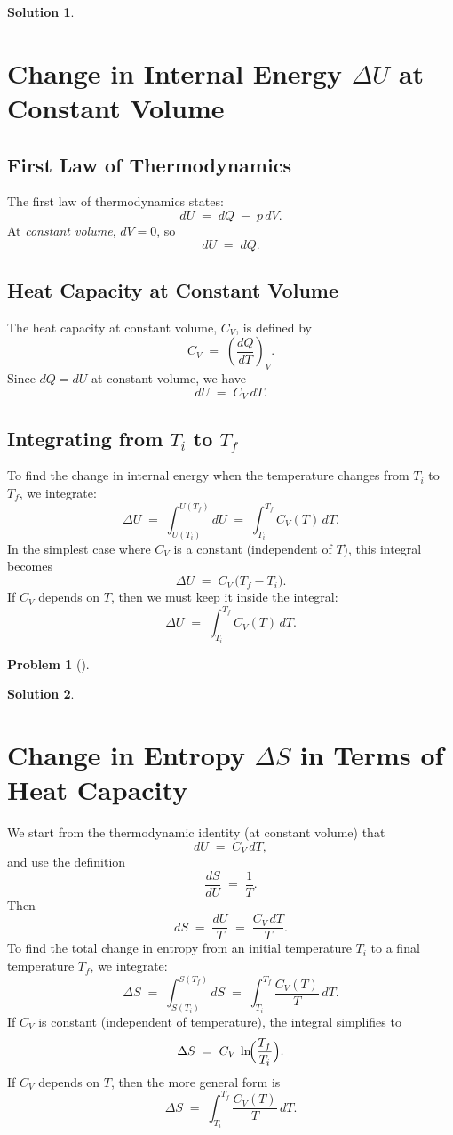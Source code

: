 \documentclass[12pt]{article}
\theoremstyle{definition} %
\newtheorem{solution}{Solution}
\newtheorem{problem}{Problem}
\theoremstyle{plain} %
\begin{document}
\begin{solution}
    \section*{Change in Internal Energy \(\Delta U\) at Constant Volume}

\subsection*{First Law of Thermodynamics}

The first law of thermodynamics states:
\[
dU \;=\; dQ \;-\; p\,dV.
\]
At \emph{constant volume}, \(dV = 0\), so
\[
dU \;=\; dQ.
\]

\subsection*{Heat Capacity at Constant Volume}

The heat capacity at constant volume, \(C_V\), is defined by
\[
C_V \;=\; \left(\frac{dQ}{dT}\right)_{V}.
\]
Since \(dQ = dU\) at constant volume, we have
\[
dU \;=\; C_V \, dT.
\]

\subsection*{Integrating from \(\displaystyle T_i\) to \(\displaystyle T_f\)}

To find the change in internal energy when the temperature changes from \(T_i\) 
to \(T_f\), we integrate:
\[
\Delta U 
\;=\; \int_{U(T_i)}^{U(T_f)} dU
\;=\; \int_{T_i}^{T_f} C_V(T)\,dT.
\]
In the simplest case where \(C_V\) is a constant (independent of \(T\)), 
this integral becomes
\[
\Delta U \;=\; C_V \,\bigl(T_f - T_i\bigr).
\]
If \(C_V\) depends on \(T\), then we must keep it inside the integral:
\[
\Delta U 
\;=\; \int_{T_i}^{T_f} C_V(T)\,dT.
\]
\end{solution}
\begin{problem}[]
    
\end{problem}
\begin{solution}
    \section*{Change in Entropy \(\Delta S\) in Terms of Heat Capacity}

We start from the thermodynamic identity (at constant volume) that
\[
dU \;=\; C_V \, dT,
\]
and use the definition
\[
\frac{dS}{dU} \;=\; \frac{1}{T}.
\]
Then
\[
dS 
\;=\; \frac{dU}{T} 
\;=\; \frac{C_V\,dT}{T}.
\]
To find the total change in entropy from an initial temperature \(T_i\) 
to a final temperature \(T_f\), we integrate:
\[
\Delta S 
\;=\; \int_{S(T_i)}^{S(T_f)} dS
\;=\; \int_{T_i}^{T_f} \frac{C_V(T)}{T}\,dT.
\]
If \(C_V\) is constant (independent of temperature), the integral 
simplifies to
\[
\Delta S 
\;=\; C_V \,\ln\!\Bigl(\frac{T_f}{T_i}\Bigr).
\]
If \(C_V\) depends on \(T\), then the more general form is
\[
\Delta S 
\;=\; \int_{T_i}^{T_f} \frac{C_V(T)}{T}\,dT.
\]
\end{solution}
\end{document}
